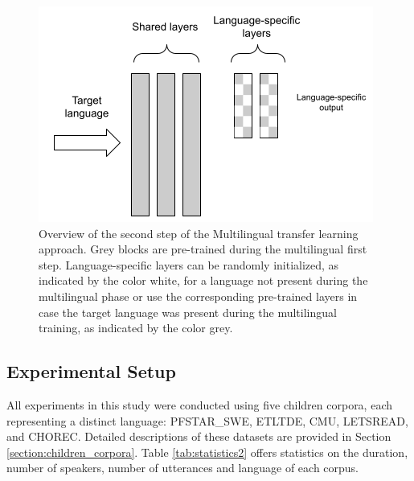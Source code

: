 
\begin{figure}[t]
\begin{center}
\includegraphics[scale=0.7]{imgs/Ours_final.png}
\caption{Overview of the second step of the Multilingual transfer learning approach. Grey blocks are pre-trained during the multilingual first step. Language-specific layers can be randomly initialized, as indicated by the color white, for a language not present during the multilingual phase or use the corresponding pre-trained layers in case the target language was present during the multilingual training, as indicated by the color grey.}
\label{fig:MLTL1}
\end{center}
\end{figure}


\subsection{Experimental Setup}
\label{section:corpus}
All experiments in this study were conducted using five children corpora, each representing a distinct language: PFSTAR\_SWE, ETLTDE, CMU, LETSREAD, and CHOREC. Detailed descriptions of these datasets are provided in Section \ref{section:children_corpora}. Table \ref{tab:statistics2} offers statistics on the duration, number of speakers, number of utterances and language of each corpus.

